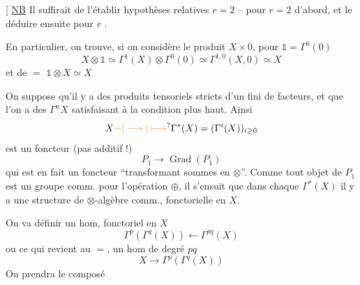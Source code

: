 [ \uline{NB} Il suffirait de l'établir 
hypothèses relatives $r=2$ -- pour $r=2$ d'abord,
et le déduire ensuite pour $r$ .

En particulier, on trouve,  si on
considère le produit $X\times0$, pour $\mathbb{1}=\Gamma^0(0)$
\[
X\otimes\mathbb{1}\simeq\Gamma^1(X)\otimes\Gamma^0(0)\simeq\Gamma^{1,0}(X,0)\simeq X
\]
et de $=$ $\mathbb{1}\otimes X\simeq X$ 

On suppose qu'il y a des produits tensoriels
stricts d'un  fini de facteurs, et que
l'on a des $\Gamma^n X$ satisfaisant à la condition
plus haut.
Ainsi
\[
X\unsure{-|\longrightarrow|\longmapsto}\Gamma^*(X)=(\Gamma^i(X))_{i\geq0}
\]
est un foncteur (pas  additif !)
\[
P_1\longrightarrow\operatorname{Grad}(P_1)
\]
qui est en fait un foncteur
``transformant sommes en $\otimes$''. Comme
tout objet de $P_1$ est un  groupe comm.
pour l'opération $\oplus$, il s'ensuit que
dans chaque $\Gamma^*(X)$ il y a une structure
de $\otimes$-algèbre  comm., fonctorielle en $X$.

On va définir  un hom, fonctoriel en $X$
\[
\Gamma^p(\Gamma^q(X))\longleftarrow\Gamma^{pq}(X)\tag*{($*$)}
\]
ou ce qui revient au $=$, un hom 
de degré $pq$
\[
X\longrightarrow\Gamma^p(\Gamma^q(X))
\]
On prendra le composé

